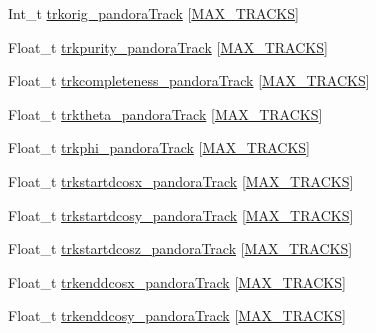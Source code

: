 \begin{DoxyCompactItemize}
\item 
Int\-\_\-t \hyperlink{classanatree_a042a0c394e2ef31d4a0c98b35742eaaf}{trkorig\-\_\-pandora\-Track} \mbox{[}\hyperlink{anatree__core__v09410002__orig_8h_a327fd4e796e4a0d78947524c96e4362e}{M\-A\-X\-\_\-\-T\-R\-A\-C\-K\-S}\mbox{]}
\item 
Float\-\_\-t \hyperlink{classanatree_a67264ab449821d6add354177992fda96}{trkpurity\-\_\-pandora\-Track} \mbox{[}\hyperlink{anatree__core__v09410002__orig_8h_a327fd4e796e4a0d78947524c96e4362e}{M\-A\-X\-\_\-\-T\-R\-A\-C\-K\-S}\mbox{]}
\item 
Float\-\_\-t \hyperlink{classanatree_ae61e5564601170300a2631b20ac7de0d}{trkcompleteness\-\_\-pandora\-Track} \mbox{[}\hyperlink{anatree__core__v09410002__orig_8h_a327fd4e796e4a0d78947524c96e4362e}{M\-A\-X\-\_\-\-T\-R\-A\-C\-K\-S}\mbox{]}
\item 
Float\-\_\-t \hyperlink{classanatree_a19cf8542bace3df2c75c84fd1a9f79a3}{trktheta\-\_\-pandora\-Track} \mbox{[}\hyperlink{anatree__core__v09410002__orig_8h_a327fd4e796e4a0d78947524c96e4362e}{M\-A\-X\-\_\-\-T\-R\-A\-C\-K\-S}\mbox{]}
\item 
Float\-\_\-t \hyperlink{classanatree_a461c0ab2f9a673d271f39c309d30c1cc}{trkphi\-\_\-pandora\-Track} \mbox{[}\hyperlink{anatree__core__v09410002__orig_8h_a327fd4e796e4a0d78947524c96e4362e}{M\-A\-X\-\_\-\-T\-R\-A\-C\-K\-S}\mbox{]}
\item 
Float\-\_\-t \hyperlink{classanatree_a2a476447fc959e075cf018e75f1e676e}{trkstartdcosx\-\_\-pandora\-Track} \mbox{[}\hyperlink{anatree__core__v09410002__orig_8h_a327fd4e796e4a0d78947524c96e4362e}{M\-A\-X\-\_\-\-T\-R\-A\-C\-K\-S}\mbox{]}
\item 
Float\-\_\-t \hyperlink{classanatree_a5cd7c212620288052de913f877c3e5bd}{trkstartdcosy\-\_\-pandora\-Track} \mbox{[}\hyperlink{anatree__core__v09410002__orig_8h_a327fd4e796e4a0d78947524c96e4362e}{M\-A\-X\-\_\-\-T\-R\-A\-C\-K\-S}\mbox{]}
\item 
Float\-\_\-t \hyperlink{classanatree_a47d8c8451ce118eefb61124b3d29e117}{trkstartdcosz\-\_\-pandora\-Track} \mbox{[}\hyperlink{anatree__core__v09410002__orig_8h_a327fd4e796e4a0d78947524c96e4362e}{M\-A\-X\-\_\-\-T\-R\-A\-C\-K\-S}\mbox{]}
\item 
Float\-\_\-t \hyperlink{classanatree_aa0aa24445aa4728bf37f43695db4cfb9}{trkenddcosx\-\_\-pandora\-Track} \mbox{[}\hyperlink{anatree__core__v09410002__orig_8h_a327fd4e796e4a0d78947524c96e4362e}{M\-A\-X\-\_\-\-T\-R\-A\-C\-K\-S}\mbox{]}
\item 
Float\-\_\-t \hyperlink{classanatree_a095b032439341cd11848dbfbd5710f72}{trkenddcosy\-\_\-pandora\-Track} \mbox{[}\hyperlink{anatree__core__v09410002__orig_8h_a327fd4e796e4a0d78947524c96e4362e}{M\-A\-X\-\_\-\-T\-R\-A\-C\-K\-S}\mbox{]}

\end{DoxyCompactItemize}
